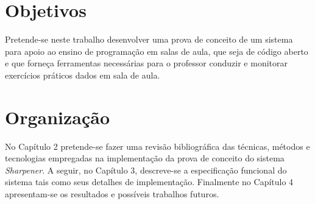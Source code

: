 \section{Objetivos}
Pretende-se neste trabalho desenvolver uma prova de conceito de um sistema para apoio 
ao ensino de programação em salas de aula, que seja de código aberto e que forneça 
ferramentas necessárias para o professor conduzir e monitorar exercícios práticos dados 
em sala de aula.

\section{Organização}
No Capítulo 2 pretende-se fazer uma revisão bibliográfica das técnicas, métodos e tecnologias
empregadas na implementação 
da prova de conceito do sistema \emph{Sharpener}. A seguir, no Capítulo 3, descreve-se a especificação 
funcional do sistema tais como seus detalhes de implementação. Finalmente no Capítulo 4 apresentam-se 
os resultados e possíveis trabalhos futuros.

